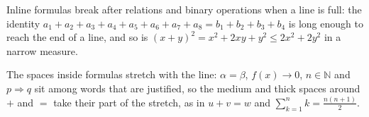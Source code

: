 \documentclass{article}
\begin{document}
Inline formulas break after relations and binary operations when a line is full: the identity $a_1 + a_2 + a_3 + a_4 + a_5 + a_6 + a_7 + a_8 = b_1 + b_2 + b_3 + b_4$ is long enough to reach the end of a line, and so is $(x+y)^2 = x^2 + 2xy + y^2 \le 2x^2 + 2y^2$ in a narrow measure.

The spaces inside formulas stretch with the line: $\alpha = \beta$, $f(x) \to 0$, $n \in \mathbb{N}$ and $p \Rightarrow q$ sit among words that are justified, so the medium and thick spaces around $+$ and $=$ take their part of the stretch, as in $u + v = w$ and $\sum_{k=1}^{n} k = \frac{n(n+1)}{2}$.
\end{document}
